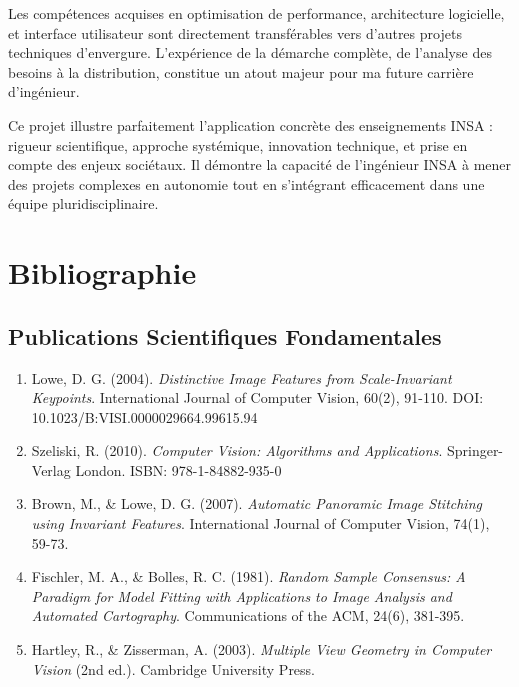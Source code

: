 \documentclass[12pt,a4paper]{article}
\begin{document}
Les compétences acquises en optimisation de performance, architecture logicielle, et interface utilisateur sont directement transférables vers d'autres projets techniques d'envergure. L'expérience de la démarche complète, de l'analyse des besoins à la distribution, constitue un atout majeur pour ma future carrière d'ingénieur.

Ce projet illustre parfaitement l'application concrète des enseignements INSA : rigueur scientifique, approche systémique, innovation technique, et prise en compte des enjeux sociétaux. Il démontre la capacité de l'ingénieur INSA à mener des projets complexes en autonomie tout en s'intégrant efficacement dans une équipe pluridisciplinaire.

\newpage

\section{Bibliographie}

\subsection{Publications Scientifiques Fondamentales}

\begin{enumerate}
\item Lowe, D. G. (2004). \textit{Distinctive Image Features from Scale-Invariant Keypoints}. International Journal of Computer Vision, 60(2), 91-110. DOI: 10.1023/B:VISI.0000029664.99615.94

\item Szeliski, R. (2010). \textit{Computer Vision: Algorithms and Applications}. Springer-Verlag London. ISBN: 978-1-84882-935-0

\item Brown, M., \& Lowe, D. G. (2007). \textit{Automatic Panoramic Image Stitching using Invariant Features}. International Journal of Computer Vision, 74(1), 59-73.

\item Fischler, M. A., \& Bolles, R. C. (1981). \textit{Random Sample Consensus: A Paradigm for Model Fitting with Applications to Image Analysis and Automated Cartography}. Communications of the ACM, 24(6), 381-395.

\item Hartley, R., \& Zisserman, A. (2003). \textit{Multiple View Geometry in Computer Vision} (2nd ed.). Cambridge University Press.
\end{enumerate}
\end{document}
